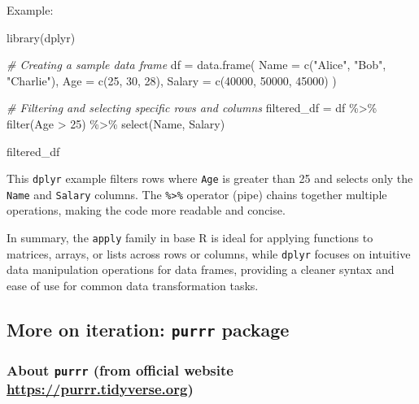 \documentclass[
]{article}
\newenvironment{Shaded}{}{}
\newcommand{\AttributeTok}[1]{\textcolor[rgb]{0.49,0.56,0.16}{#1}}
\newcommand{\CommentTok}[1]{\textcolor[rgb]{0.38,0.63,0.69}{\textit{#1}}}
\newcommand{\DecValTok}[1]{\textcolor[rgb]{0.25,0.63,0.44}{#1}}
\newcommand{\FunctionTok}[1]{\textcolor[rgb]{0.02,0.16,0.49}{#1}}
\newcommand{\NormalTok}[1]{#1}
\newcommand{\OtherTok}[1]{\textcolor[rgb]{0.00,0.44,0.13}{#1}}
\newcommand{\SpecialCharTok}[1]{\textcolor[rgb]{0.25,0.44,0.63}{#1}}
\newcommand{\StringTok}[1]{\textcolor[rgb]{0.25,0.44,0.63}{#1}}
\begin{document}
\begin{enumerate}
  Example:

\begin{Shaded}
\begin{Highlighting}[]
 \FunctionTok{library}\NormalTok{(dplyr)}

 \CommentTok{\# Creating a sample data frame}
\NormalTok{ df }\OtherTok{=} \FunctionTok{data.frame}\NormalTok{(}
   \AttributeTok{Name =} \FunctionTok{c}\NormalTok{(}\StringTok{"Alice"}\NormalTok{, }\StringTok{"Bob"}\NormalTok{, }\StringTok{"Charlie"}\NormalTok{),}
   \AttributeTok{Age =} \FunctionTok{c}\NormalTok{(}\DecValTok{25}\NormalTok{, }\DecValTok{30}\NormalTok{, }\DecValTok{28}\NormalTok{),}
   \AttributeTok{Salary =} \FunctionTok{c}\NormalTok{(}\DecValTok{40000}\NormalTok{, }\DecValTok{50000}\NormalTok{, }\DecValTok{45000}\NormalTok{)}
\NormalTok{ )}

 \CommentTok{\# Filtering and selecting specific rows and columns}
\NormalTok{ filtered\_df }\OtherTok{=}\NormalTok{ df }\SpecialCharTok{\%\textgreater{}\%}
   \FunctionTok{filter}\NormalTok{(Age }\SpecialCharTok{\textgreater{}} \DecValTok{25}\NormalTok{) }\SpecialCharTok{\%\textgreater{}\%}
   \FunctionTok{select}\NormalTok{(Name, Salary)}

\NormalTok{ filtered\_df}
\end{Highlighting}
\end{Shaded}

  This \texttt{dplyr} example filters rows where \texttt{Age} is greater
  than 25 and selects only the \texttt{Name} and \texttt{Salary}
  columns. The \texttt{\%\textgreater{}\%} operator (pipe) chains
  together multiple operations, making the code more readable and
  concise.
\end{enumerate}

In summary, the \texttt{apply} family in base R is ideal for applying
functions to matrices, arrays, or lists across rows or columns, while
\texttt{dplyr} focuses on intuitive data manipulation operations for
data frames, providing a cleaner syntax and ease of use for common data
transformation tasks.

\hypertarget{more-on-iteration-purrr-package}{%
\subsection{\texorpdfstring{More on iteration: \texttt{purrr}
package}{More on iteration: purrr package}}\label{more-on-iteration-purrr-package}}

\hypertarget{about-purrr-from-official-website-httpspurrrtidyverseorg}{%
\subsubsection{\texorpdfstring{About \texttt{purrr} (from official
website
\url{https://purrr.tidyverse.org})}{About purrr (from official website https://purrr.tidyverse.org)}}\label{about-purrr-from-official-website-httpspurrrtidyverseorg}}
\end{document}
